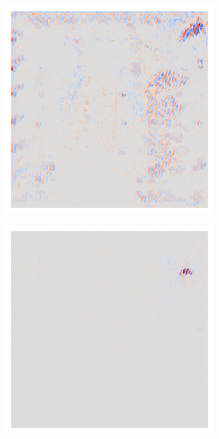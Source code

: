 \begin{figure}[H]
    \centering
     \\
    \begin{subfigure}{0.095\linewidth}
        \centering
        \includegraphics[height=1\linewidth]{01-images/05-resultate/uap_resnet18/uap0-resnet18-covidx_data-n200-robustificationslevel0.png}
    \end{subfigure}\hfill%
    \begin{subfigure}{0.095\linewidth}
        \centering
        \includegraphics[height=1\linewidth]{01-images/05-resultate/uap_resnet18/uap0-resnet18-covidx_data-n200-robustificationslevel1.png}

\end{subfigure}
\end{figure}
